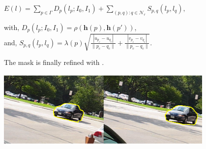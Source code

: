 \documentclass[landscape,final,a0paper,fontscale=0.285]{baposter}
\begin{document}
\begin{poster}
{     \vspace{1.5 mm}

     \centering
     $ E(l) = \displaystyle \sum_{p \in \Gamma} D_p(l_p;I_0,I_1) +
     \sum_{(p,q): q \in \mathcal{N}_r} S_{p,q}(l_p,l_q), $ \\
     \raggedright with,  $ D_p(l_p;I_0,I_1) = \rho (\boldsymbol{h}(p), \boldsymbol{h}(p')) $, \\
     and,  $ S_{p,q}(l_p, l_q) = \lambda(p)
  \sqrt{\frac{|u_{p_c}-u_{q_c}|}{\|p_c-q_c\|}+ \frac{|v_{p_c}-v_{q_c}|}{\|p_c-q_c\|}}. $ \\

     \vspace{1.5 mm}

    The mask is finally refined with \cite{c3}.
    \centerline{\includegraphics[width=0.8\textwidth]{../images/carSeg.png}}
}


\end{poster}
\end{document}

